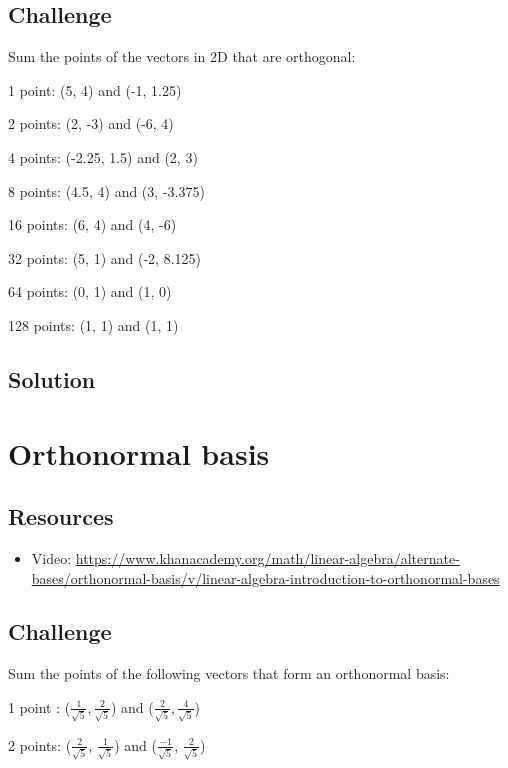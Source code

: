 \subsection*{Challenge}
Sum the points of the vectors in 2D that are orthogonal:

1 point: (5, 4) and (-1, 1.25)

2 points:  (2, -3) and (-6, 4)

4 points: (-2.25, 1.5) and (2, 3)

8 points: (4.5, 4) and (3, -3.375)

16 points: (6, 4) and (4, -6)

32 points: (5, 1) and (-2, 8.125)

64 points: (0, 1) and (1, 0)

128 points: (1, 1) and (1, 1)

\subsection*{Solution}
\six{}


\timebox




\newpage
\section{Orthonormal basis}

\subsection*{Resources}
\begin{itemize}
    \item Video: \url{https://www.khanacademy.org/math/linear-algebra/alternate-bases/orthonormal-basis/v/linear-algebra-introduction-to-orthonormal-bases}
\end{itemize}

\subsection*{Challenge}
Sum the points of the following vectors that form an orthonormal basis:

1 point :
($\displaystyle \frac{1}{\sqrt{5}}, \frac{2}{\sqrt{5}}$) and
($\displaystyle \frac{2}{\sqrt{5}}, \frac{4}{\sqrt{5}}$)

2 points:
($\displaystyle \frac{2}{\sqrt{5}}$, $\displaystyle \frac{1}{\sqrt{5}}$) and
($\displaystyle \frac{-1}{\sqrt{5}}$, $\displaystyle \frac{2}{\sqrt{5}}$)


